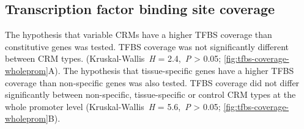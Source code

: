 \documentclass[../main.tex]{subfiles}
\begin{document}
\subsection{Transcription factor binding site coverage}
The hypothesis that variable CRMs have a higher TFBS coverage than constitutive genes was tested.
TFBS coverage was not significantly different between CRM types. (Kruskal\hyp{}Wallis~\textit{H} = 2.4,~\textit{P} \textgreater{} 0.05; \autoref{fig:tfbs-coverage-wholeprom}A).
The hypothesis that tissue\hyp{}specific genes have a higher TFBS coverage than non\hyp{}specific genes was also  tested. TFBS coverage did not differ significantly between non\hyp{}specific, tissue\hyp{}specific or control CRM types at the whole promoter level (Kruskal\hyp{}Wallis~\textit{H} = 5.6,~\textit{P} \textgreater{} 0.05; \autoref{fig:tfbs-coverage-wholeprom}B).
\end{document}
